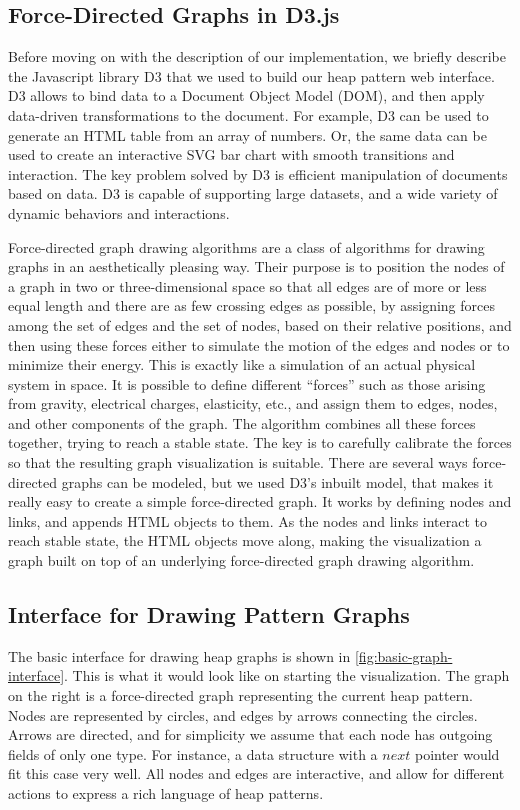 \subsection{Force-Directed Graphs in D3.js}
Before moving on with the description of our implementation, we briefly describe the Javascript library D3 that we used to build our heap pattern web interface. D3 allows to bind data to a Document Object Model (DOM), and then apply data-driven transformations to the document. For example, D3 can be used to generate an HTML table from an array of numbers. Or, the same data can be used to create an interactive SVG bar chart with smooth transitions and interaction. The key problem solved by D3 is efficient manipulation of documents based on data. D3 is capable of supporting large datasets, and a wide variety of dynamic behaviors and interactions.

Force-directed graph drawing algorithms \cite{eades84, fruchterman91} are a class of algorithms for drawing graphs in an aesthetically pleasing way. Their purpose is to position the nodes of a graph in two or three-dimensional space so that all edges are of more or less equal length and there are as few crossing edges as possible, by assigning forces among the set of edges and the set of nodes, based on their relative positions, and then using these forces either to simulate the motion of the edges and nodes or to minimize their energy. This is exactly like a simulation of an actual physical system in space. It is possible to define different ``forces'' such as those arising from gravity, electrical charges, elasticity, etc., and assign them to edges, nodes, and other components of the graph. The algorithm combines all these forces together, trying to reach a stable state. The key is to carefully calibrate the forces so that the resulting graph visualization is suitable. There are several ways force-directed graphs can be modeled, but we used D3's inbuilt model, that makes it really easy to create a simple force-directed graph. It works by defining nodes and links, and appends HTML objects to them. As the nodes and links interact to reach stable state, the HTML objects move along, making the visualization a graph built on top of an underlying force-directed graph drawing algorithm.

\subsection{Interface for Drawing Pattern Graphs}

The basic interface for drawing heap graphs is shown in \autoref{fig:basic-graph-interface}. This is what it would look like on starting the visualization. The graph on the right is a force-directed graph representing the current heap pattern. Nodes are represented by circles, and edges by arrows connecting the circles. Arrows are directed, and for simplicity we assume that each node has outgoing fields of only one type. For instance, a data structure with a $next$ pointer would fit this case very well. All nodes and edges are interactive, and allow for different actions to express a rich language of heap patterns.

